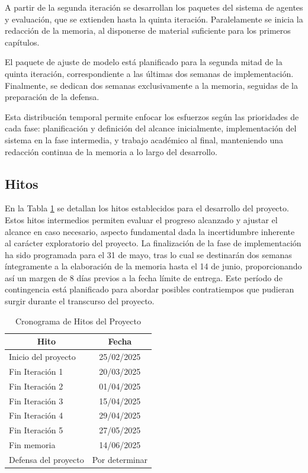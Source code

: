 A partir de la segunda iteración se desarrollan los paquetes del sistema de agentes y evaluación, que se extienden hasta la quinta iteración. Paralelamente se inicia la redacción de la memoria, al disponerse de material suficiente para los primeros capítulos.

El paquete de ajuste de modelo está planificado para la segunda mitad de la quinta iteración, correspondiente a las últimas dos semanas de implementación. Finalmente, se dedican dos semanas exclusivamente a la memoria, seguidas de la preparación de la defensa.

Esta distribución temporal permite enfocar los esfuerzos según las prioridades de cada fase: planificación y definición del alcance inicialmente, implementación del sistema en la fase intermedia, y trabajo académico al final, manteniendo una redacción continua de la memoria a lo largo del desarrollo.

\subsection{Hitos}\label{sec:hitos}

En la Tabla \ref{tab:hitos} se detallan los hitos establecidos para el desarrollo del proyecto. Estos hitos intermedios permiten evaluar el progreso alcanzado y ajustar el alcance en caso necesario, aspecto fundamental dada la incertidumbre inherente al carácter exploratorio del proyecto. La finalización de la fase de implementación ha sido programada para el 31 de mayo, tras lo cual se destinarán dos semanas íntegramente a la elaboración de la memoria hasta el 14 de junio, proporcionando así un margen de 8 días previos a la fecha límite de entrega. Este período de contingencia está planificado para abordar posibles contratiempos que pudieran surgir durante el transcurso del proyecto.


\begin{table}[hbtp]\centering
\begin{tabular}{|l|c|}
\hline
\multicolumn{1}{|c|}{\textbf{Hito}} & \multicolumn{1}{c|}{\textbf{Fecha}} \\
\hline
Inicio del proyecto & 25/02/2025 \\
\hline
Fin Iteración 1 & 20/03/2025 \\
\hline
Fin Iteración 2 & 01/04/2025 \\
\hline
Fin Iteración 3 & 15/04/2025 \\
\hline
Fin Iteración 4 & 29/04/2025 \\
\hline
Fin Iteración 5 & 27/05/2025 \\
\hline
Fin memoria & 14/06/2025 \\
\hline
Defensa del proyecto & Por determinar \\
\hline
\end{tabular}
\caption{Cronograma de Hitos del Proyecto}
\label{tab:hitos}
\end{table}

